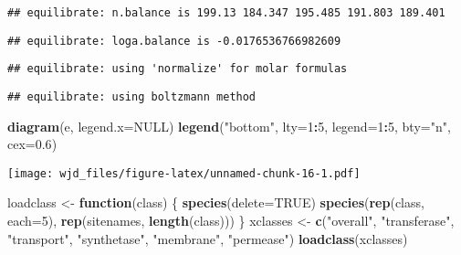 \documentclass[]{article}
\newenvironment{Shaded}{\begin{snugshade}}{\end{snugshade}}
\newcommand{\KeywordTok}[1]{\textcolor[rgb]{0.13,0.29,0.53}{\textbf{#1}}}
\newcommand{\DataTypeTok}[1]{\textcolor[rgb]{0.13,0.29,0.53}{#1}}
\newcommand{\DecValTok}[1]{\textcolor[rgb]{0.00,0.00,0.81}{#1}}
\newcommand{\FloatTok}[1]{\textcolor[rgb]{0.00,0.00,0.81}{#1}}
\newcommand{\StringTok}[1]{\textcolor[rgb]{0.31,0.60,0.02}{#1}}
\newcommand{\OtherTok}[1]{\textcolor[rgb]{0.56,0.35,0.01}{#1}}
\newcommand{\ControlFlowTok}[1]{\textcolor[rgb]{0.13,0.29,0.53}{\textbf{#1}}}
\newcommand{\OperatorTok}[1]{\textcolor[rgb]{0.81,0.36,0.00}{\textbf{#1}}}
\newcommand{\NormalTok}[1]{#1}
\begin{document}
\begin{verbatim}
## equilibrate: n.balance is 199.13 184.347 195.485 191.803 189.401
\end{verbatim}

\begin{verbatim}
## equilibrate: loga.balance is -0.0176536766982609
\end{verbatim}

\begin{verbatim}
## equilibrate: using 'normalize' for molar formulas
\end{verbatim}

\begin{verbatim}
## equilibrate: using boltzmann method
\end{verbatim}

\begin{Shaded}
\begin{Highlighting}[]
\KeywordTok{diagram}\NormalTok{(e, }\DataTypeTok{legend.x=}\OtherTok{NULL}\NormalTok{)}
\KeywordTok{legend}\NormalTok{(}\StringTok{"bottom"}\NormalTok{, }\DataTypeTok{lty=}\DecValTok{1}\OperatorTok{:}\DecValTok{5}\NormalTok{, }\DataTypeTok{legend=}\DecValTok{1}\OperatorTok{:}\DecValTok{5}\NormalTok{, }\DataTypeTok{bty=}\StringTok{"n"}\NormalTok{, }\DataTypeTok{cex=}\FloatTok{0.6}\NormalTok{)}
\end{Highlighting}
\end{Shaded}

\texttt{[image: wjd\_files/figure-latex/unnamed-chunk-16-1.pdf]}

\begin{Shaded}
\begin{Highlighting}[]
\NormalTok{loadclass <-}\StringTok{ }\ControlFlowTok{function}\NormalTok{(class) \{}
\KeywordTok{species}\NormalTok{(}\DataTypeTok{delete=}\OtherTok{TRUE}\NormalTok{)}
\KeywordTok{species}\NormalTok{(}\KeywordTok{rep}\NormalTok{(class, }\DataTypeTok{each=}\DecValTok{5}\NormalTok{), }\KeywordTok{rep}\NormalTok{(sitenames, }\KeywordTok{length}\NormalTok{(class)))}
\NormalTok{\}}
\NormalTok{xclasses <-}\StringTok{ }\KeywordTok{c}\NormalTok{(}\StringTok{"overall"}\NormalTok{, }\StringTok{"transferase"}\NormalTok{, }\StringTok{"transport"}\NormalTok{, }\StringTok{"synthetase"}\NormalTok{, }\StringTok{"membrane"}\NormalTok{, }\StringTok{"permease"}\NormalTok{)}
\KeywordTok{loadclass}\NormalTok{(xclasses)}
\end{Highlighting}
\end{Shaded}
\end{document}
